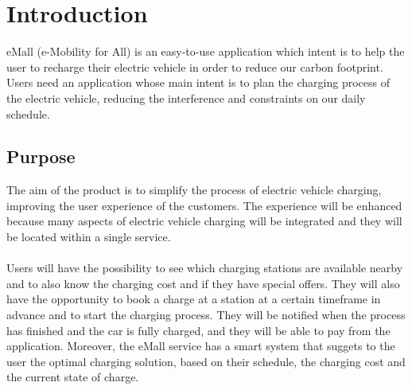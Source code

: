 \section{Introduction}
eMall (e-Mobility for All) is an easy-to-use application which intent is to help the user to recharge their electric vehicle in order to reduce our carbon footprint.
Users need an application whose main intent is to plan the charging process of the electric vehicle, reducing the interference and constraints on our daily schedule.

\subsection{Purpose}

The aim of the product is to simplify the process of electric vehicle charging, improving the user experience of the customers.
The experience will be enhanced because many aspects of electric vehicle charging will be integrated and they will be located within a single service.
\\\\
Users will have the possibility to see which charging stations are available nearby and to also know the charging cost and if they have special offers.
They will also have the opportunity to book a charge at a station at a certain timeframe in advance and to start the charging process.
They will be notified when the process has finished and the car is fully charged, and they will be able to pay from the application.
Moreover, the eMall service has a smart system that suggets to the user the optimal charging solution, based on their schedule, the charging cost and the current state of charge.
